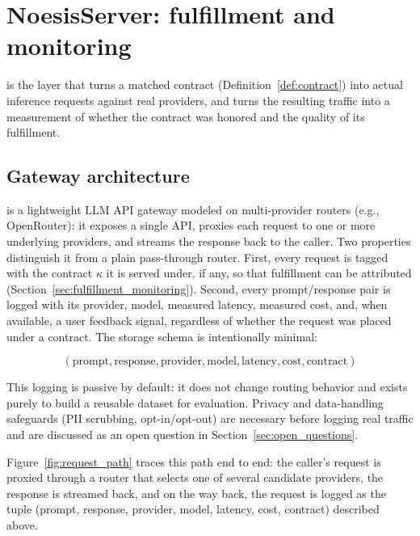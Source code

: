 \section{NoesisServer: fulfillment and monitoring}
\label{sec:noesis_server}

\NoesisServer{} is the layer that turns a matched contract
(Definition~\ref{def:contract}) into actual inference requests against real
providers, and turns the resulting traffic into a measurement of whether the
contract was honored and the quality of its fulfillment.

\subsection{Gateway architecture}
\label{sec:gateway_architecture}

\NoesisServer{} is a lightweight LLM API gateway modeled on
multi-provider routers (e.g., OpenRouter): it exposes a single API,
proxies each request to one or more underlying providers, and streams the
response back to the caller. Two properties distinguish it from a plain
pass-through router. First, every request is tagged with the contract
$\kappa$ it is served under, if any, so that fulfillment can be attributed
(Section~\ref{sec:fulfillment_monitoring}). Second, every prompt/response
pair is logged with its provider, model, measured latency, measured cost,
and, when available, a user feedback signal, regardless of whether the
request was placed under a contract. The storage schema is intentionally
minimal:

$$
  (\text{prompt}, \text{response}, \text{provider}, \text{model},
   \text{latency}, \text{cost}, \text{contract})
$$

This logging is passive by default: it does not change routing behavior and
exists purely to build a reusable dataset for evaluation. Privacy and
data-handling safeguards (PII scrubbing, opt-in/opt-out) are necessary before
logging real traffic and are discussed as an open question in
Section~\ref{sec:open_questions}.

Figure~\ref{fig:request_path} traces this path end to end: the caller's
request is proxied through a router that selects one of several
candidate providers, the response is streamed back, and on the way back,
the request is logged as the tuple (prompt, response, provider, model, latency,
cost, contract) described above.

